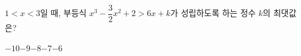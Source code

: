 $1<x<3$일 때, 부등식 $x^3-\dfrac{3}{2}x^2+2>6x+k$가 성립하도록 하는 정수 $k$의 최댓값은?
\begin{choices32}{$-10$}{$-9$}{$-8$}{$-7$}{$-6$}\end{choices32}
